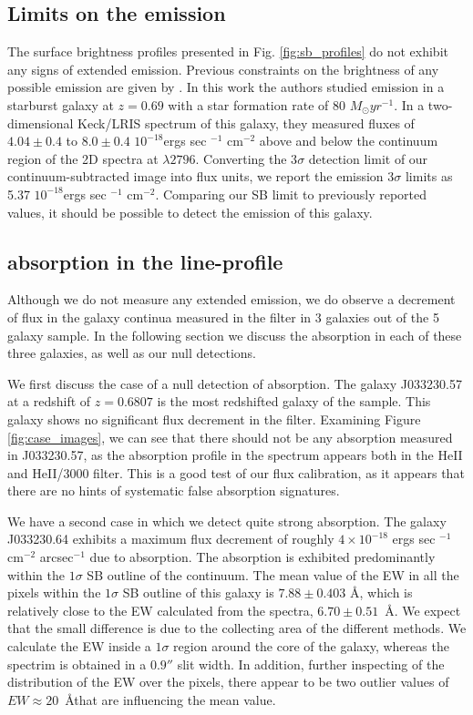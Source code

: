 \documentclass[twocolumn]{aastex6}
\begin{document}
\subsection{Limits on the  emission}
The surface brightness profiles presented in Fig. \ref{fig:sb_profiles} do not exhibit any signs of extended  emission. Previous constraints on the brightness of any possible emission are given by  \citep{Rubin_2011}. In this work the authors studied emission in a starburst galaxy at $z=0.69$ with a star formation rate of 80 $M_{\odot} yr^{-1}$. In a two-dimensional Keck/LRIS spectrum of this galaxy, they measured fluxes of $4.04 \pm 0.4$ to $8.0\pm 0.4$ $10^{-18}$ergs sec $^{-1}$ cm$^{-2}$  above and below the continuum region of the 2D spectra at $\lambda 2796$. Converting the 3$\sigma$ detection limit of our continuum-subtracted  image into flux units, we report the  emission 3$\sigma$ limits as 5.37 $10^{-18}$ergs sec $^{-1}$ cm$^{-2}$. Comparing our SB limit to previously reported values, it should be possible to detect the emission of this galaxy.

\subsection{ absorption in the line-profile}
Although we do not measure any extended  emission, we do observe a decrement of flux in the galaxy continua measured in the  filter in 3 galaxies out of the 5 galaxy sample. In the following section we discuss the absorption in each of these three galaxies, as well as our null detections.

We first discuss the case of a null detection of  absorption. The galaxy J033230.57 at a redshift of $z=0.6807$ is the most redshifted galaxy of the sample. This galaxy shows no significant flux decrement in the  filter. Examining Figure \ref{fig:case_images}, we can see that there should not be any absorption measured in J033230.57, as the absorption profile in the spectrum appears both in the HeII and HeII/3000 filter. This is a good test of our flux calibration, as it appears that there are no hints of systematic false absorption signatures.

We have a second case in which we detect quite strong absorption. The galaxy J033230.64 exhibits a maximum flux decrement of roughly $4\times10^{-18}$ ergs sec $^{-1}$ cm$^{-2}$ arcsec$^{-1}$ due to  absorption. The absorption is exhibited predominantly within the $1\sigma$ SB outline of the continuum. The mean value of the EW in all the pixels within the $1\sigma$ SB outline of this galaxy is $7.88 \pm 0.403$ \AA, which is relatively close to the EW calculated from the spectra, $6.70 \pm 0.51$\ \AA. We expect that the small difference is due to the collecting area of the different methods. We calculate the EW inside a $1\sigma$ region around the core of the galaxy, whereas the spectrim is obtained in a $0.9''$ slit width. In addition, further inspecting of the distribution of the EW over the pixels, there appear to be two outlier values of $EW\approx 20$\ \AA that are influencing the mean value.
\end{document}
